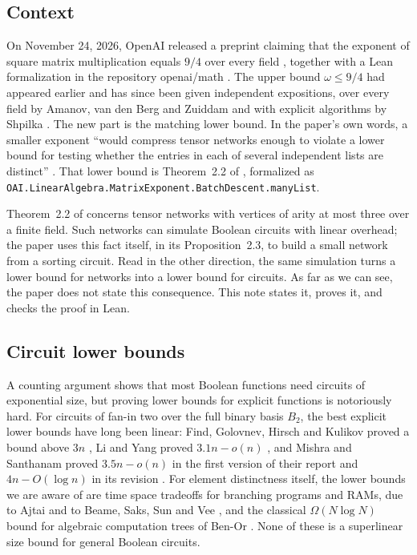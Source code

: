 \documentclass[11pt]{amsart}
\theoremstyle{definition}
\theoremstyle{remark}
\begin{document}
\subsection{Context}
On November 24, 2026, OpenAI released a preprint claiming that the exponent of square matrix multiplication equals $9/4$ over every field \cite{OAI94}, together with a Lean formalization in the repository openai/math \cite{OAImath}. The upper bound $\omega\le 9/4$ had appeared earlier \cite{OAIupper} and has since been given independent expositions, over every field by Amanov, van den Berg and Zuiddam \cite{AvdBZ} and with explicit algorithms by Shpilka \cite{Shpilka26}. The new part is the matching lower bound. In the paper's own words, a smaller exponent ``would compress tensor networks enough to violate a lower bound for testing whether the entries in each of several independent lists are distinct'' \cite[Abstract]{OAI94}. That lower bound is Theorem~2.2 of \cite{OAI94}, formalized as \texttt{OAI.\allowbreak LinearAlgebra.\allowbreak MatrixExponent.\allowbreak BatchDescent.\allowbreak manyList}.

Theorem~2.2 of \cite{OAI94} concerns tensor networks with vertices of arity at most three over a finite field. Such networks can simulate Boolean circuits with linear overhead; the paper uses this fact itself, in its Proposition~2.3, to build a small network from a sorting circuit. Read in the other direction, the same simulation turns a lower bound for networks into a lower bound for circuits. As far as we can see, the paper does not state this consequence. This note states it, proves it, and checks the proof in Lean.

\subsection{Circuit lower bounds}
A counting argument shows that most Boolean functions need circuits of exponential size, but proving lower bounds for explicit functions is notoriously hard. For circuits of fan-in two over the full binary basis $B_2$, the best explicit lower bounds have long been linear: Find, Golovnev, Hirsch and Kulikov proved a bound above $3n$ \cite{FGHK16}, Li and Yang proved $3.1n-o(n)$ \cite{LiYang22}, and Mishra and Santhanam proved $3.5n-o(n)$ in the first version of their report and $4n-O(\log n)$ in its revision \cite{MishraSanthanam26}. For element distinctness itself, the lower bounds we are aware of are time space tradeoffs for branching programs and RAMs, due to Ajtai \cite{Ajtai02} and to Beame, Saks, Sun and Vee \cite{BSSV03}, and the classical $\Omega(N\log N)$ bound for algebraic computation trees of Ben-Or \cite{BenOr83}. None of these is a superlinear size bound for general Boolean circuits.
\end{document}
